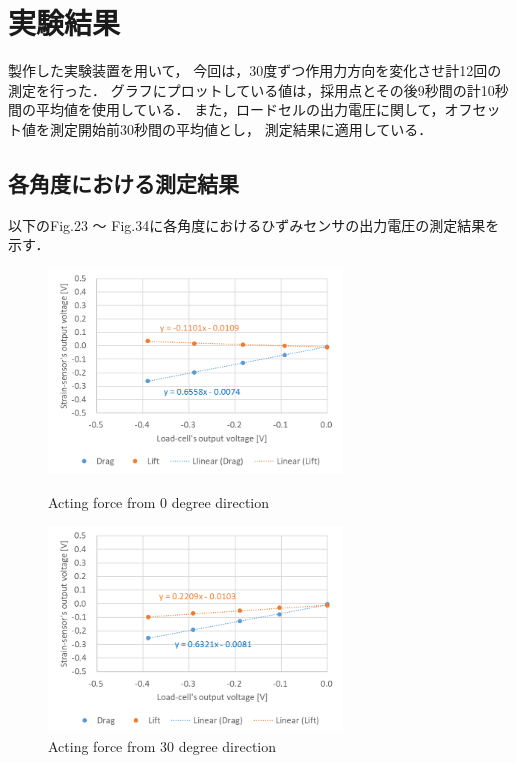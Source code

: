 \documentclass[twocolumn,a4j]{jsarticle}
\begin{document}
\newpage

\section{実験結果}
製作した実験装置を用いて，
今回は，30度ずつ作用力方向を変化させ計12回の測定を行った．
グラフにプロットしている値は，採用点とその後9秒間の計10秒間の平均値を使用している．
また，ロードセルの出力電圧に関して，オフセット値を測定開始前30秒間の平均値とし，
測定結果に適用している．



\subsection{各角度における測定結果}
以下のFig.23 ～ Fig.34に各角度におけるひずみセンサの出力電圧の測定結果を示す．

\begin{figure}[htbp]
    \footnotesize
    \begin{center}
        \includegraphics[width=78mm]{../../2111/images/0.png}
        \caption{Acting force from 0 degree direction}
        \includegraphics[width=78mm]{../../2111/images/30.png}
        \caption{Acting force from 30 degree direction}
    \end{center}
\end{figure}
\end{document}
